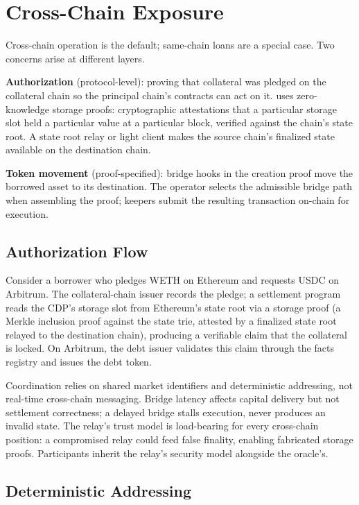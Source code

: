 \section{Cross-Chain Exposure}
\label{sec:crosschain}

Cross-chain operation is the default; same-chain loans are a special case. Two concerns arise at different layers.

\textbf{Authorization} (protocol-level): proving that collateral was pledged on the collateral chain so the principal chain's contracts can act on it. \daloc{} uses zero-knowledge storage proofs: cryptographic attestations that a particular storage slot held a particular value at a particular block, verified against the chain's state root. A state root relay or light client makes the source chain's finalized state available on the destination chain.

\textbf{Token movement} (proof-specified): bridge hooks in the creation proof move the borrowed asset to its destination. The operator selects the admissible bridge path when assembling the proof; keepers submit the resulting transaction on-chain for execution.

\subsection{Authorization Flow}

Consider a borrower who pledges WETH on Ethereum and requests USDC on Arbitrum. The collateral-chain issuer records the pledge; a settlement program reads the CDP's storage slot from Ethereum's state root via a storage proof (a Merkle inclusion proof against the state trie, attested by a finalized state root relayed to the destination chain), producing a verifiable claim that the collateral is locked. On Arbitrum, the debt issuer validates this claim through the facts registry and issues the debt token.

Coordination relies on shared market identifiers and deterministic addressing, not real-time cross-chain messaging. Bridge latency affects capital delivery but not settlement correctness; a delayed bridge stalls execution, never produces an invalid state. The relay's trust model is load-bearing for every cross-chain position: a compromised relay could feed false finality, enabling fabricated storage proofs. Participants inherit the relay's security model alongside the oracle's.

\subsection{Deterministic Addressing}

